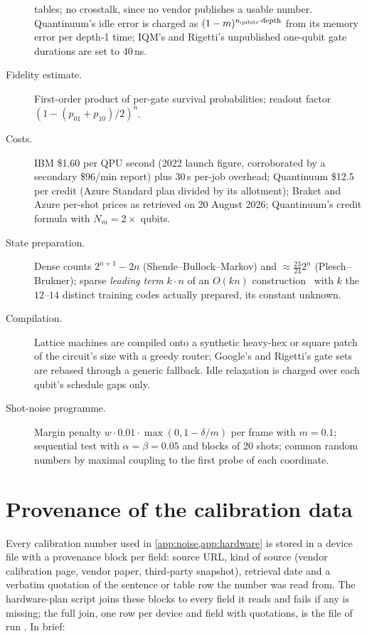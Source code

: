 \begin{description}
tables; no crosstalk, since no vendor publishes a usable number.  Quantinuum's idle error is
charged as $(1-m)^{n_{\rm qubits}\cdot{\rm depth}}$ from its memory error per depth-1 time;
IQM's and Rigetti's unpublished one-qubit gate durations are set to 40\,ns.
\item[Fidelity estimate.]  First-order product of per-gate survival probabilities; readout
factor $(1-(p_{01}+p_{10})/2)^n$.
\item[Costs.]  IBM \$1.60 per QPU second (2022 launch figure, corroborated by a secondary
\$96/min report) plus 30\,s per-job overhead; Quantinuum \$12.5 per credit (Azure Standard plan
divided by its allotment); Braket and Azure per-shot prices as retrieved on 20 August 2026;
Quantinuum's credit formula with $N_m=2\times$ qubits.
\item[State preparation.]  Dense counts $2^{n+1}-2n$ (Shende--Bullock--Markov) and
$\approx\tfrac{23}{24}2^n$ (Plesch--Brukner); sparse \emph{leading term} $k\cdot n$ of an
$O(kn)$ construction~\cite{gleinig2021sparse} with $k$ the $12$--$14$ distinct training codes
actually prepared, its constant unknown.
\item[Compilation.]  Lattice machines are compiled onto a synthetic heavy-hex or square patch
of the circuit's size with a greedy router; Google's and Rigetti's gate sets are rebased
through a generic fallback.  Idle relaxation is charged over each qubit's schedule gaps only.
\item[Shot-noise programme.]  Margin penalty $w\cdot0.01\cdot\max(0,1-\delta/m)$ per frame with
$m=0.1$; sequential test with $\alpha=\beta=0.05$ and blocks of 20 shots; common random numbers
by maximal coupling to the first probe of each coordinate.
\end{description}


\section{Provenance of the calibration data}
\label{app:provenance}

Every calibration number used in \cref{app:noise,app:hardware} is stored in a device file with
a provenance block per field: source URL, kind of source (vendor calibration page, vendor
paper, third-party snapshot), retrieval date and a verbatim quotation of the sentence or table
row the number was read from.  The hardware-plan script joins these blocks to every field it
reads and fails if any is missing; the full join, one row per device and field with quotations,
is the file  of run .  In brief:

